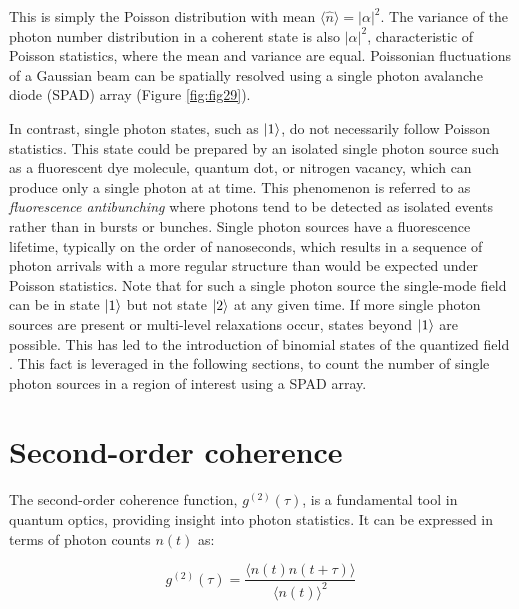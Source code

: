 This is simply the Poisson distribution with mean $\langle \hat{n} \rangle = \lvert\alpha\lvert^2$. The variance of the photon number distribution in a coherent state is also $\lvert\alpha\lvert^2$, characteristic of Poisson statistics, where the mean and variance are equal. Poissonian fluctuations of a Gaussian beam can be spatially resolved using a single photon avalanche diode (SPAD) array (Figure \ref{fig:fig29}).

In contrast, single photon states, such as $\ket{1}$, do not necessarily follow Poisson statistics. This state could be prepared by an isolated single photon source such as a fluorescent dye molecule, quantum dot, or nitrogen vacancy, which can produce only a single photon at at time. This phenomenon is referred to as \emph{fluorescence antibunching} where photons tend to be detected as isolated events rather than in bursts or bunches. Single photon sources have a fluorescence lifetime, typically on the order of nanoseconds, which results in a sequence of photon arrivals with a more regular structure than would be expected under Poisson statistics. Note that for such a single photon source the single-mode field can be in state $\ket{1}$ but not state $\ket{2}$ at any given time. If more single photon sources are present or multi-level relaxations occur, states beyond $\ket{1}$ are possible. This has led to the introduction of binomial states of the quantized field \parencite{Stoler1985}. This fact is leveraged in the following sections, to count the number of single photon sources in a region of interest using a SPAD array.

\section{Second-order coherence}

The second-order coherence function, $ g^{(2)}(\tau) $, is a fundamental tool in quantum optics, providing insight into photon statistics. It can be expressed in terms of photon counts $ n(t) $ as:

\begin{equation}
g^{(2)}(\tau) = \frac{\langle n(t) n(t+\tau) \rangle}{\langle n(t) \rangle^2}
\end{equation}

